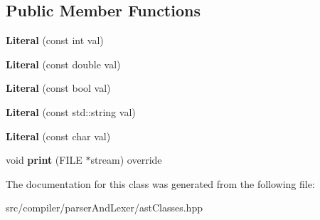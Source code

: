 \subsection*{Public Member Functions}
\begin{DoxyCompactItemize}
\item 
{\bfseries Literal} (const int val)\hypertarget{classslang__AST__NODES_1_1Literal_ad798bc229c978a146e476e373ab11b3d}{}\label{classslang__AST__NODES_1_1Literal_ad798bc229c978a146e476e373ab11b3d}

\item 
{\bfseries Literal} (const double val)\hypertarget{classslang__AST__NODES_1_1Literal_a427c1a12545ba81884e4a28829c0a757}{}\label{classslang__AST__NODES_1_1Literal_a427c1a12545ba81884e4a28829c0a757}

\item 
{\bfseries Literal} (const bool val)\hypertarget{classslang__AST__NODES_1_1Literal_a552dcdbe04750ac46bdac2ffb984cef2}{}\label{classslang__AST__NODES_1_1Literal_a552dcdbe04750ac46bdac2ffb984cef2}

\item 
{\bfseries Literal} (const std\+::string val)\hypertarget{classslang__AST__NODES_1_1Literal_a3abd91746cd21ef8ddf6e0309655085e}{}\label{classslang__AST__NODES_1_1Literal_a3abd91746cd21ef8ddf6e0309655085e}

\item 
{\bfseries Literal} (const char val)\hypertarget{classslang__AST__NODES_1_1Literal_aa7c179a9b9697ff1bf5b2f3bc4805aaa}{}\label{classslang__AST__NODES_1_1Literal_aa7c179a9b9697ff1bf5b2f3bc4805aaa}

\item 
void {\bfseries print} (F\+I\+LE $\ast$stream) override\hypertarget{classslang__AST__NODES_1_1Literal_ac50bf74dc205581b39c5ea297ba6a6c4}{}\label{classslang__AST__NODES_1_1Literal_ac50bf74dc205581b39c5ea297ba6a6c4}

\end{DoxyCompactItemize}


The documentation for this class was generated from the following file\+:\begin{DoxyCompactItemize}
\item 
src/compiler/parser\+And\+Lexer/ast\+Classes.\+hpp\end{DoxyCompactItemize}
